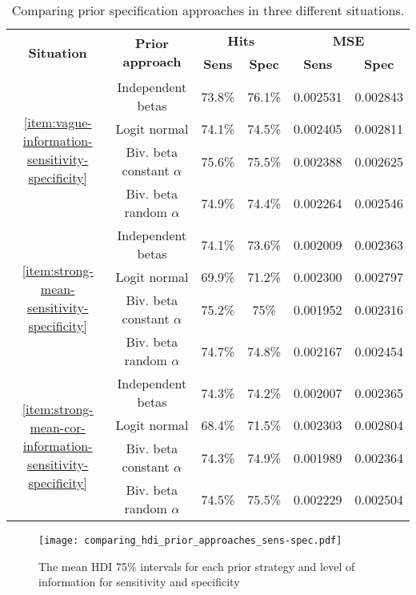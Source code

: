 \begin{table}[tbp]
  \centering
  \caption{\label{tab:comparison-prior-approach-sensitivity-specificity}Comparing
  prior specification approaches in three different situations.}
  \begin{tabular}{cccccc}
    \hline
    \multirow{2}{*}{\textbf{Situation}} & \multirow{2}{*}{\textbf{Prior approach}} & \multicolumn{2}{c}{\textbf{Hits}} & \multicolumn{2}{c}{\textbf{MSE}} \\ \cline{3-6} 
     &  & \textbf{Sens} & \textbf{Spec} & \textbf{Sens} & \textbf{Spec} \\ \hline
    \multirow{4}{*}{\autoref{item:vague-information-sensitivity-specificity}} & Independent betas & 73.8\% & 76.1\% & 0.002531 & 0.002843 \\
     & Logit normal & 74.1\% & 74.5\% & 0.002405 & 0.002811 \\
     & Biv. beta constant $\alpha$ & 75.6\% & 75.5\% & 0.002388 & 0.002625 \\
     & Biv. beta random $\alpha$ & 74.9\% & 74.4\% & 0.002264 & 0.002546 \\
    \multirow{4}{*}{\autoref{item:strong-mean-sensitivity-specificity}} & Independent betas & 74.1\% & 73.6\% & 0.002009 & 0.002363 \\
     & Logit normal & 69.9\% & 71.2\% & 0.002300 & 0.002797 \\
     & Biv. beta constant $\alpha$ & 75.2\% & 75\% & 0.001952 & 0.002316 \\
     & Biv. beta random $\alpha$ & 74.7\% & 74.8\% & 0.002167 & 0.002454 \\
    \multirow{4}{*}{\autoref{item:strong-mean-cor-information-sensitivity-specificity}} & Independent betas & 74.3\% & 74.2\% & 0.002007 & 0.002365 \\
     & Logit normal & 68.4\% & 71.5\% & 0.002303 & 0.002804 \\
     & Biv. beta constant $\alpha$ & 74.3\% & 74.9\% & 0.001989 & 0.002364 \\
     & Biv. beta random $\alpha$ & 74.5\% & 75.5\% & 0.002229 & 0.002504 \\ \hline
    \end{tabular}
  \end{table}

\begin{figure}
  \centering
  \caption{\label{fig:comparing_hdi_prior_approaches_sens-spec} The mean HDI 75\% intervals
  for each prior strategy and level of information for sensitivity and specificity}
  \texttt{[image: comparing\_hdi\_prior\_approaches\_sens-spec.pdf]}
\end{figure}

